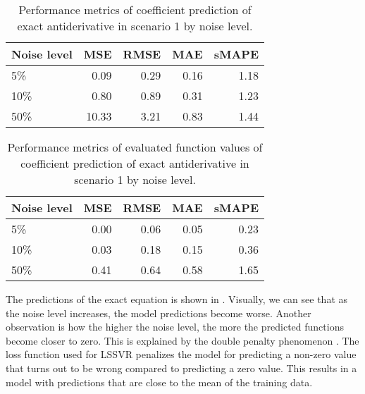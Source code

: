 \begin{table}[H]
  \caption{Performance metrics of coefficient prediction of exact antiderivative in scenario 1 by noise level.}\label{table:scenario_1_exact_spectral_metrics}
  \centering
  \begin{tabular}{lrrrr}
    \toprule
    Noise level & MSE   & RMSE & MAE  & sMAPE \\
    \midrule
    5\%         & 0.09  & 0.29 & 0.16 & 1.18  \\
    10\%        & 0.80  & 0.89 & 0.31 & 1.23  \\
    50\%        & 10.33 & 3.21 & 0.83 & 1.44  \\
    \bottomrule
  \end{tabular}
\end{table}

\begin{table}[H]
  \caption{Performance metrics of evaluated function values of coefficient prediction of exact antiderivative in scenario 1 by noise level.}\label{table:scenario_1_exact_function_metrics}
  \centering
  \begin{tabular}{lrrrr}
    \toprule
    Noise level & MSE  & RMSE & MAE  & sMAPE \\
    \midrule
    5\%         & 0.00 & 0.06 & 0.05 & 0.23  \\
    10\%        & 0.03 & 0.18 & 0.15 & 0.36  \\
    50\%        & 0.41 & 0.64 & 0.58 & 1.65  \\
    \bottomrule
  \end{tabular}
\end{table}

The predictions of the exact equation is shown in . Visually, we can see that as the noise level increases, the model predictions become worse. Another observation is how the higher the noise level, the more the predicted functions become closer to zero. This is explained by the double penalty phenomenon \autocite{lledoScaledependentVerificationPrecipitation2023}. The loss function used for LSSVR penalizes the model for predicting a non-zero value that turns out to be wrong compared to predicting a zero value. This results in a model with predictions that are close to the mean of the training data.

